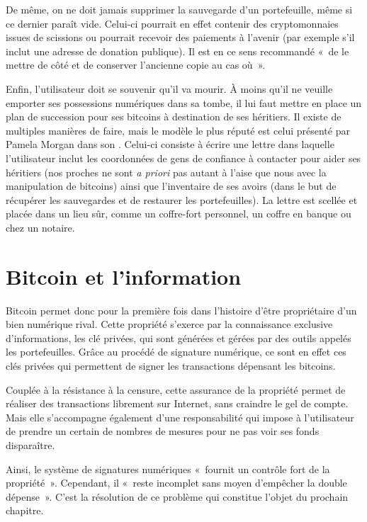 De même, on ne doit jamais supprimer la sauvegarde d'un portefeuille, même si ce dernier paraît vide. Celui-ci pourrait en effet contenir des cryptomonnaies issues de scissions ou pourrait recevoir des paiements à l'avenir (par exemple s'il inclut une adresse de donation publique). Il est en ce sens recommandé «~de le mettre de côté et de conserver l'ancienne copie au cas où~».

Enfin, l'utilisateur doit se souvenir qu'il va mourir. À moins qu'il ne veuille emporter ses possessions numériques dans sa tombe, il lui faut mettre en place un plan de succession pour ses bitcoins à destination de ses héritiers. Il existe de multiples manières de faire, mais le modèle le plus réputé est celui présenté par Pamela Morgan dans son . Celui-ci consiste à écrire une lettre dans laquelle l'utilisateur inclut les coordonnées de gens de confiance à contacter pour aider ses héritiers (nos proches ne sont \emph{a priori} pas autant à l'aise que nous avec la manipulation de bitcoins) ainsi que l'inventaire de ses avoirs (dans le but de récupérer les sauvegardes et de restaurer les portefeuilles). La lettre est scellée et placée dans un lieu sûr, comme un coffre-fort personnel, un coffre en banque ou chez un notaire.

\section*{Bitcoin et l'information}

Bitcoin permet donc pour la première fois dans l'histoire d'être propriétaire d'un bien numérique rival. Cette propriété s'exerce par la connaissance exclusive d'informations, les clé privées, qui sont générées et gérées par des outils appelés les portefeuilles. Grâce au procédé de signature numérique, ce sont en effet ces clés privées qui permettent de signer les transactions dépensant les bitcoins.

Couplée à la résistance à la censure, cette assurance de la propriété permet de réaliser des transactions librement sur Internet, sans craindre le gel de compte. Mais elle s'accompagne également d'une responsabilité qui impose à l'utilisateur de prendre un certain de nombres de mesures pour ne pas voir ses fonds disparaître.

Ainsi, le système de signatures numériques «~fournit un contrôle fort de la propriété~». Cependant, il «~reste incomplet sans moyen d'empêcher la double dépense~». C'est la résolution de ce problème qui constitue l'objet du prochain chapitre.
